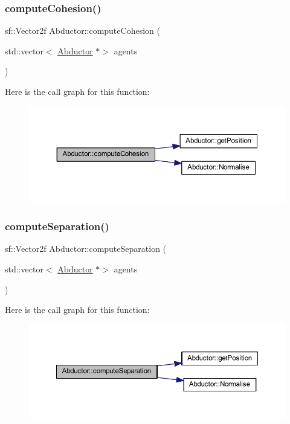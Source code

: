 \subsubsection{\texorpdfstring{compute\+Cohesion()}{computeCohesion()}}
{\footnotesize\ttfamily sf\+::\+Vector2f Abductor\+::compute\+Cohesion (\begin{DoxyParamCaption}\item[{std\+::vector$<$ \hyperlink{class_abductor}{Abductor} $\ast$$>$}]{agents }\end{DoxyParamCaption})}

Here is the call graph for this function\+:
\nopagebreak
\begin{figure}[H]
\begin{center}
\leavevmode
\includegraphics[width=350pt]{class_abductor_a8aa45d9b7d770533a60eae180c08d96f_cgraph}
\end{center}
\end{figure}
\mbox{\label{class_abductor_ac72ef77b379beff56efed7f66442c649}} 
\subsubsection{\texorpdfstring{compute\+Separation()}{computeSeparation()}}
{\footnotesize\ttfamily sf\+::\+Vector2f Abductor\+::compute\+Separation (\begin{DoxyParamCaption}\item[{std\+::vector$<$ \hyperlink{class_abductor}{Abductor} $\ast$$>$}]{agents }\end{DoxyParamCaption})}

Here is the call graph for this function\+:
\nopagebreak
\begin{figure}[H]
\begin{center}
\leavevmode
\includegraphics[width=350pt]{class_abductor_ac72ef77b379beff56efed7f66442c649_cgraph}
\end{center}
\end{figure}
\mbox{\label{class_abductor_ac9a6ed96e2b0ffce0984656f8cff114e}} 
